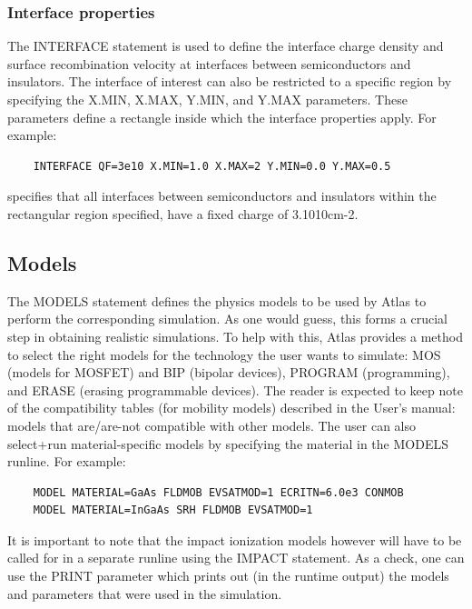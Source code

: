 \documentclass[11pt]{article}
\begin{document}
\subsubsection{Interface properties}
The INTERFACE statement is used to define the interface charge density and surface recombination velocity at interfaces between semiconductors and insulators. The interface of interest can also be restricted to a specific region by specifying the X.MIN, X.MAX, Y.MIN, and Y.MAX parameters. These parameters define a rectangle inside which the interface properties apply. For example:
\begin{verbatim}
    INTERFACE QF=3e10 X.MIN=1.0 X.MAX=2 Y.MIN=0.0 Y.MAX=0.5
\end{verbatim}
specifies that all interfaces between semiconductors and insulators within the rectangular region specified, have a fixed charge of 3.1010cm-2.

\subsection{Models}
The MODELS statement defines the physics models to be used by Atlas to perform the corresponding simulation. As one would guess, this forms a crucial step in obtaining realistic simulations. To help with this, Atlas provides a method to select the right models for the technology the user wants to simulate: MOS (models for MOSFET) and BIP (bipolar devices), PROGRAM (programming), and ERASE (erasing programmable devices). The reader is expected to keep note of the compatibility tables (for mobility models) described in the User's manual: models that are/are-not compatible with other models.
\newline The user can also select+run material-specific models by specifying the material in the MODELS runline. For example:
\begin{verbatim}
    MODEL MATERIAL=GaAs FLDMOB EVSATMOD=1 ECRITN=6.0e3 CONMOB
    MODEL MATERIAL=InGaAs SRH FLDMOB EVSATMOD=1
\end{verbatim}
It is important to note that the impact ionization models however will have to be called for in a separate runline using the IMPACT statement. 
\newline As a check, one can use the PRINT parameter which prints out (in the runtime output) the models and parameters that were used in the simulation.
\end{document}
